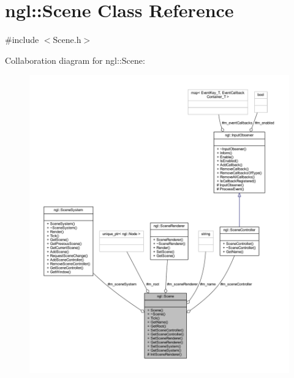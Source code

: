 \hypertarget{classngl_1_1_scene}{}\section{ngl\+:\+:Scene Class Reference}
\label{classngl_1_1_scene}


{\ttfamily \#include $<$Scene.\+h$>$}



Collaboration diagram for ngl\+:\+:Scene\+:
\nopagebreak
\begin{figure}[H]
\begin{center}
\leavevmode
\includegraphics[width=350pt]{classngl_1_1_scene__coll__graph}
\end{center}
\end{figure}
